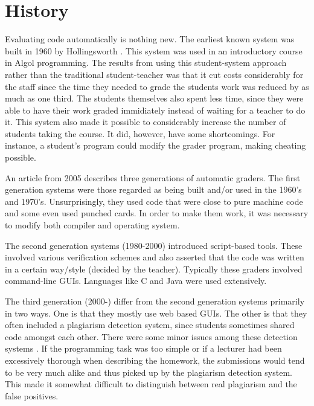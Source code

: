 \section{History}
Evaluating code automatically is nothing new. The earliest known system was built in 1960 by Hollingsworth \cite{Hollingsworth}. This system was used in an introductory course in Algol programming. The results from using this student-system approach rather than the traditional student-teacher was that it cut costs considerably for the staff since the time they needed to grade the students work was reduced by as much as one third. The students themselves also spent less time, since they were able to have their work graded immidiately instead of waiting for a teacher to do it. This system also made it possible to considerably increase the number of students taking the course. It did, however, have some shortcomings. For instance, a student's program could modify the grader program, making cheating possible. 

An article from 2005 \cite{GenerationReview} describes three generations of automatic graders. The first generation systems were those regarded as being built and/or used in the 1960's and 1970's. Unsurprisingly, they used code that were close to pure machine code and some even used punched cards. In order to make them work, it was necessary to modify both compiler and operating system. 

The second generation systems (1980-2000) introduced script-based tools. These involved various verification schemes and also asserted that the code was written in a certain way/style (decided by the teacher). Typically these graders involved command-line GUIs. Languages like C and Java were used extensively.

The third generation (2000-) differ from the second generation systems primarily in two ways. One is that they mostly use web based GUIs. The other is that they often included a plagiarism detection system, since students sometimes shared code amongst each other. There were some minor issues among these detection systems \cite{GenerationReview} \cite{Gradebot} . If the programming task was too simple or if a lecturer had been excessively thorough when describing the homework, the submissions would tend to be very much alike and thus picked up by the plagiarism detection system. This made it somewhat difficult to distinguish between real plagiarism and the false positives. 